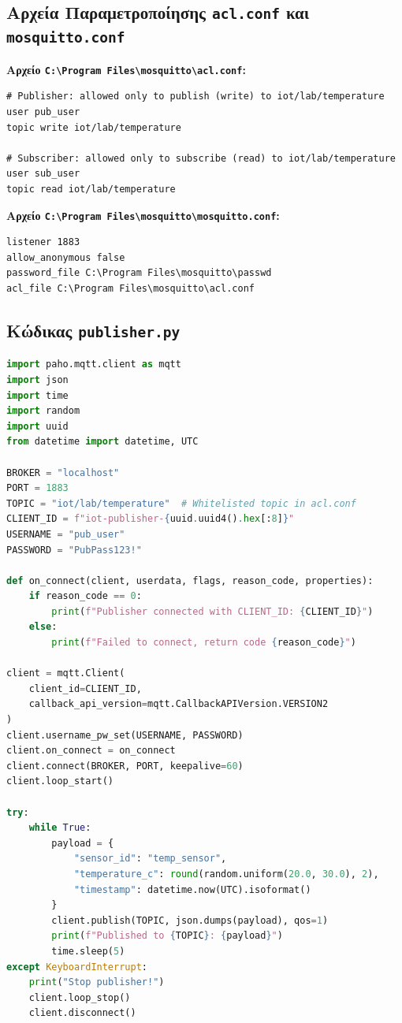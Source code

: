 \documentclass[11pt, a4paper]{article}
\begin{document}
\subsection{Αρχεία Παραμετροποίησης \texttt{acl.conf} και \texttt{mosquitto.conf}}

\textbf{Αρχείο \texttt{C:\textbackslash{}Program Files\textbackslash{}mosquitto\textbackslash{}acl.conf}:}
\begin{lstlisting}[language={}]
# Publisher: allowed only to publish (write) to iot/lab/temperature
user pub_user
topic write iot/lab/temperature

# Subscriber: allowed only to subscribe (read) to iot/lab/temperature
user sub_user
topic read iot/lab/temperature
\end{lstlisting}

\textbf{Αρχείο \texttt{C:\textbackslash{}Program Files\textbackslash{}mosquitto\textbackslash{}mosquitto.conf}:}
\begin{lstlisting}[language={}]
listener 1883
allow_anonymous false
password_file C:\Program Files\mosquitto\passwd
acl_file C:\Program Files\mosquitto\acl.conf
\end{lstlisting}

\subsection{Κώδικας \texttt{publisher.py}}
\begin{lstlisting}[language=Python]
import paho.mqtt.client as mqtt
import json
import time
import random
import uuid
from datetime import datetime, UTC

BROKER = "localhost"
PORT = 1883
TOPIC = "iot/lab/temperature"  # Whitelisted topic in acl.conf
CLIENT_ID = f"iot-publisher-{uuid.uuid4().hex[:8]}"
USERNAME = "pub_user"
PASSWORD = "PubPass123!"

def on_connect(client, userdata, flags, reason_code, properties):
    if reason_code == 0:
        print(f"Publisher connected with CLIENT_ID: {CLIENT_ID}")
    else:
        print(f"Failed to connect, return code {reason_code}")

client = mqtt.Client(
    client_id=CLIENT_ID,
    callback_api_version=mqtt.CallbackAPIVersion.VERSION2
)
client.username_pw_set(USERNAME, PASSWORD)
client.on_connect = on_connect
client.connect(BROKER, PORT, keepalive=60)
client.loop_start()

try:
    while True:
        payload = {
            "sensor_id": "temp_sensor",
            "temperature_c": round(random.uniform(20.0, 30.0), 2),
            "timestamp": datetime.now(UTC).isoformat()
        }
        client.publish(TOPIC, json.dumps(payload), qos=1)
        print(f"Published to {TOPIC}: {payload}")
        time.sleep(5)
except KeyboardInterrupt:
    print("Stop publisher!")
    client.loop_stop()
    client.disconnect()
\end{lstlisting}
\end{document}
